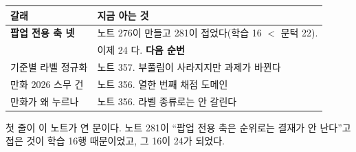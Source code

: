 \documentclass[11pt]{article}
\begin{document}
\begin{center}
\begin{tabular}{ll}
\hline
갈래 & 지금 아는 것 \\
\hline
\textbf{팝업 전용 축 넷} & 노트 276이 만들고 281이 접었다(학습 16 $<$ 문턱 22). \\
                        & 이제 24 다. \textbf{다음 순번} \\
기준별 라벨 정규화 & 노트 357. 부풀림이 사라지지만 과제가 바뀐다 \\
만화 2026 스무 건 & 노트 356. 열한 번째 채점 도메인 \\
만화가 왜 누르나 & 노트 356. 라벨 종류로는 안 갈린다 \\
\hline
\end{tabular}
\end{center}

첫 줄이 이 노트가 연 문이다. 노트 281이 ``팝업 전용 축은 순위로는 결재가
안 난다''고 접은 것이 학습 16행 때문이었고, 그 16이 24가 되었다.
\end{document}
